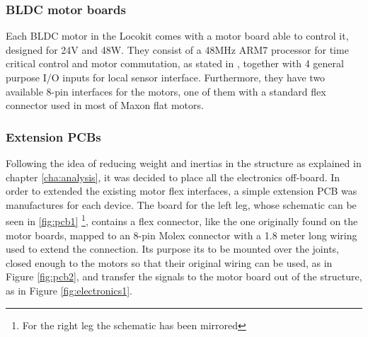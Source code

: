 \subsubsection{BLDC motor boards} %
\label{ssub:bldc_motor_boards}
Each BLDC motor in the Locokit comes with a motor board able to control it, designed for 24V and 48W.
They consist of a 48MHz ARM7 processor for time critical control and motor commutation, as stated in \cite{locokit-electronics}, together with 4 general purpose I/O inputs for local sensor interface.
Furthermore, they have two available 8-pin interfaces for the motors, one of them with a standard flex connector used in most of Maxon flat motors.


\subsubsection{Extension PCBs} %
\label{ssub:extension_pcbs}
Following the idea of reducing weight and inertias in the structure as explained in chapter \ref{cha:analysis}, it was decided to place all the electronics off-board.
In order to extended the existing motor flex interfaces, a simple extension PCB was manufactures for each device.
The board for the left leg, whose schematic can be seen in \ref{fig:pcb1} \footnote{For the right leg the schematic has been mirrored}, contains a flex connector, like the one originally found on the motor boards, mapped to an 8-pin Molex connector with a 1.8 meter long wiring used to extend the connection.
Its purpose its to be mounted over the joints, closed enough to the motors so that their original wiring can be used, as in Figure \ref{fig:pcb2}, and transfer the signals to the motor board out of the structure, as in Figure \ref{fig:electronics1}.

